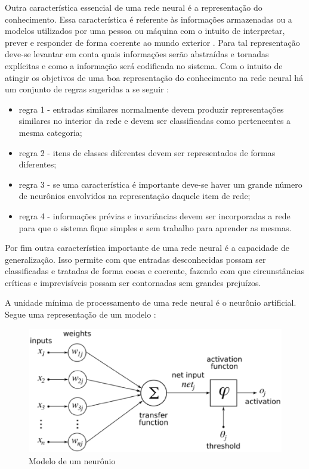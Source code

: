 Outra característica essencial de uma rede neural é a representação do conhecimento. Essa característica é referente às informações armazenadas ou a modelos utilizados por uma pessoa ou máquina com o intuito de interpretar, prever e responder de forma coerente ao mundo exterior \cite{haykin2009neural}. Para tal representação deve-se levantar em conta quais informações serão abstraídas e tornadas explícitas e como a informação será codificada no sistema. Com o intuito de atingir os objetivos de uma boa representação do conhecimento na rede neural há um conjunto de regras sugeridas a se seguir \cite{haykin2009neural}:
\begin{itemize}
	\item regra 1 - entradas similares normalmente devem produzir representações similares no interior da rede e devem ser classificadas como pertencentes a mesma categoria;
	\item regra 2 - itens de classes diferentes devem ser representados de formas diferentes;
	\item regra 3 - se uma característica é importante deve-se haver um grande número de neurônios envolvidos na representação daquele item de rede;
	\item regra 4 - informações prévias e invariâncias devem ser incorporadas a rede para que o sistema fique simples e sem trabalho para aprender as mesmas.
\end{itemize}

Por fim outra característica importante de uma rede neural é a capacidade de generalização. Isso permite com que entradas desconhecidas possam ser classificadas e tratadas de forma coesa e coerente, fazendo com que circunstâncias críticas e imprevisíveis possam ser contornadas sem grandes prejuízos.

A unidade mínima de processamento de uma rede neural é o neurônio artificial. Segue uma representação de um modelo \cite{haykin2009neural}:

\begin{figure}[h]
	\centering
		\includegraphics[scale=0.7]{figuras/neuron.eps}
	\caption{Modelo de um neurônio}
\end{figure}

